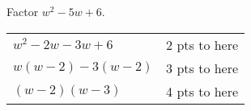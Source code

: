 
{
	Factor $w^2-5w+6$.
}
{
	\begin{tabular}{l r}
	$w^2-2w-3w+6$ & 2 pts to here\\
	$w(w-2)-3(w-2)$ & 3 pts to here\\
	$(w-2)(w-3)$ & 4 pts to here
	\end{tabular}
}



